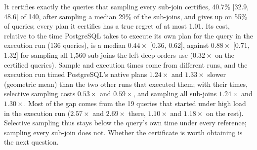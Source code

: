 \documentclass[sigconf, nonacm]{acmart}
\begin{document}
It certifies exactly the queries that sampling every sub-join certifies,
40.7\% [32.9, 48.6] of 140, after sampling a median 29\% of the sub-joins, and
gives up on 55\% of queries; every plan it certifies has a true regret of at
most 1.01. Its cost, relative to the time PostgreSQL takes to execute its own
plan for the query in the execution run (136 queries), is a median
$0.44\times$ [0.36, 0.62], against $0.88\times$ [0.71, 1.32] for sampling all
1{,}560 sub-joins the left-deep orders use ($0.32\times$ on the certified
queries). Sample and execution times come from different runs, and the
execution run timed PostgreSQL's native plans $1.24\times$ and $1.33\times$
slower (geometric mean) than the two other runs that executed them; with their
times, selective sampling costs $0.53\times$ and $0.59\times$, and sampling
all sub-joins $1.24\times$ and $1.30\times$. Most of the gap comes from the 19
queries that started under high load in the execution run ($2.57\times$ and
$2.69\times$ there, $1.10\times$ and $1.18\times$ on the rest). Selective
sampling thus stays
below the query's own time under every reference; sampling every sub-join does
not. Whether the certificate is worth obtaining is the next question.
\end{document}
